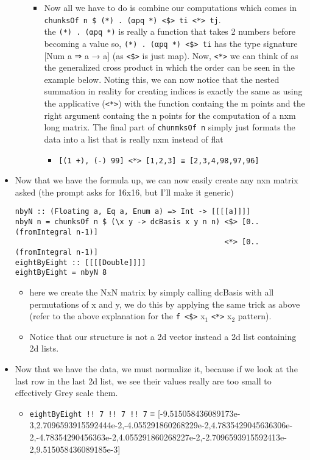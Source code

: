 \documentclass{article}
\begin{document}
\begin{itemize}
\begin{itemize}
\begin{itemize}
\item Now all we have to do is combine our computations which comes in
\texttt{chunksOf n \$ (*) . (αpq *) <\$> ti <*> tj}. \\
      the \texttt{(*) . (αpq *)} is really a function that takes 2 numbers
before becoming a value so, \texttt{(*) . (αpq *) <\$> ti} has the type
signature [Num a ⇒ a → a] (as \texttt{<\$>} is just map). Now, \texttt{<*>} we
can think of as the generalized cross product in which the order
can be seen in the example below. Noting this, we can now notice
that the nested summation in reality for creating indices is
exactly the same as using the applicative (\texttt{<*>}) with the
function containg the m points and the right argument containg the
n points for the computation of a nxm long matrix. The final
part of \texttt{chunmksOf n} simply just formats the data into a list
that is really nxm instead of flat
\begin{itemize}
\item \texttt{[(1 +), (-) 99] <*> [1,2,3] ≡ [2,3,4,98,97,96]}
\end{itemize}
\end{itemize}
\end{itemize}
\item Now that we have the formula up, we can now easily create any nxn
matrix asked (the prompt asks for 16x16, but I'll make it generic)
\begin{verbatim}
nbyN :: (Floating a, Eq a, Enum a) => Int -> [[[[a]]]]
nbyN n = chunksOf n $ (\x y -> dcBasis x y n n) <$> [0..(fromIntegral n-1)]
                                                <*> [0..(fromIntegral n-1)]
eightByEight :: [[[[Double]]]]
eightByEight = nbyN 8
\end{verbatim}
\begin{itemize}
\item here we create the NxN matrix by simply calling dcBasis with all
permutations of x and y, we do this by applying the same trick as
above (refer to the above explanation for the \texttt{f <\$>} x$_{\text{1}}$ \texttt{<*>}
x$_{\text{2}}$ pattern).
\item Notice that our structure is not a 2d vector instead a 2d list
containing 2d lists.
\end{itemize}
\item Now that we have the data, we must normalize it, because if we look
at the last row in the last 2d list, we see their values really are
too small to effectively Grey scale them.
\begin{itemize}
\item \texttt{eightByEight !! 7 !! 7 !! 7} ≡ [-9.515058436089173e-3,2.7096593915592444e-2,-4.055291860268229e-2,4.7835429045636306e-2,-4.78354290456363e-2,4.055291860268227e-2,-2.7096593915592413e-2,9.515058436089185e-3]


\end{itemize}
\end{itemize}
\end{document}
